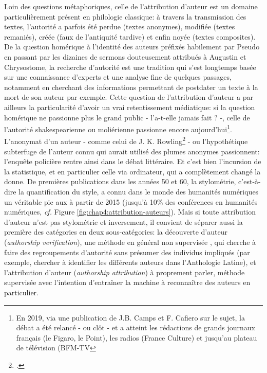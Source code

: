 Loin des questions métaphoriques, celle de l'attribution d'auteur est un domaine particulièrement présent en philologie classique: à travers la transmission des textes, l'autorité a parfois été perdue (textes anonymes), modifiée (textes remaniés), créée (faux de l'antiquité tardive) et enfin noyée (textes composites). De la question homérique à l'identité des auteurs préfixés habilement par Pseudo en passant par les dizaines de sermons douteusement attribués à Augustin et Chrysostome, la recherche d'autorité est une tradition qui s'est longtemps basée sur une connaissance d'experts et une analyse fine de quelques passages, notamment en cherchant des informations permettant de postdater un texte à la mort de son auteur par exemple. Cette question de l'attribution d'auteur a par ailleurs la particularité d'avoir un vrai retentissement médiatique: si la question homérique ne passionne plus le grand public - l'a-t-elle jamais fait ? -, celle de l'autorité shakespearienne ou moliérienne passionne encore aujourd'hui\footnote{En 2019, via une publication de J.B. Camps et F. Cafiero sur le sujet, la débat a été relancé - ou clôt - et a atteint les rédactions de grands journaux français (le Figaro, le Point), les radios (France Culture) et jusqu'au plateau de télévision (BFM-TV}. L'anonymat d'un auteur - comme celui de J. K. Rowling\footcite{juola_how_2013} - ou l'hypothétique subterfuge de l'auteur connu qui aurait utilisé des plumes anonymes passionnent: l'enquête policière rentre ainsi dans le débat littéraire. Et c'est bien l'incursion de la statistique, et en particulier celle via ordinateur, qui a complètement changé la donne. De premières publications dans les années 50 et 60, la stylométrie, c'est-à-dire la quantification du style, a connu dans le monde des humanités numériques un véritable pic aux à partir de 2015 (jusqu'à 10\% des conférences en humanités numériques, \textit{cf.} Figure \ref{fig:chap4:attribution-auteurs}). Mais si toute attribution d'auteur n'est pas stylométrie et inversement, il convient de séparer aussi la première des catégories en deux sous-catégories: la découverte d'auteur (\textit{authorship verification}), une méthode en général non supervisée , qui cherche à faire des regroupements d'autorité sans présumer des individus impliqués (par exemple, chercher à identifier les différents auteurs dans l'Anthologie Latine), et l'attribution d'auteur (\textit{authorship attribution}) à proprement parler, méthode supervisée avec l'intention d'entraîner la machine à reconnaître des auteurs en particulier.

